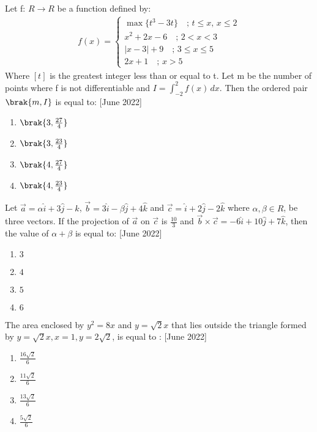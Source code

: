 \item Let f: $R\rightarrow R$ be a function defined by:
\begin{align*}
f(x) =
\begin{cases}
\max \{ t^3 - 3t \} \quad ; \, t \leq x, \, x \leq 2 \\
x^2 + 2x - 6 \quad ; \, 2 < x < 3 \\
|x - 3| + 9 \quad ; \, 3 \leq x \leq 5 \\
2x + 1 \quad ; \, x > 5
\end{cases}
\end{align*} 
Where $[t]$ is the greatest integer less than or equal to t. Let m be the number of points where f is not differentiable and $I = \int_{-2}^{2} f(x) \, dx$. Then the ordered pair $\brak{m,I}$ is equal to: \hfill[June 2022]
\begin{multicols}{2}
\begin{enumerate}
    \item $\brak{3,\frac{27}{4}}$
    \item $\brak{3,\frac{23}{4}}$
    \item $\brak{4,\frac{27}{4}}$
    \item $\brak{4,\frac{23}{4}}$
\end{enumerate}
\end{multicols}

\item Let $\vec{a}=\alpha \hat{i}+3\hat{j}-\hat{k}$, $\vec{b}=3\hat{i}-\beta\hat{j}+4\hat{k}$ and $\vec{c}=\hat{i}+2\hat{j}-2\hat{k}$ where $\alpha,\beta \in R$, be three vectors. If the projection of $\vec{a}$ on $\vec{c}$ is $\frac{10}{3}$ and $\vec{b}\times \vec{c}=-6\hat{i}+10\hat{j}+7\hat{k}$, then the value of $\alpha+\beta$ is equal to: \hfill[June 2022]
\begin{multicols}{2}
\begin{enumerate}
    \item $3$
    \item $4$
    \item $5$
    \item $6$
\end{enumerate}
\end{multicols}

\item The area enclosed by $y^2=8x$ and $y=\sqrt{2}x$ that lies outside the triangle formed by $y=\sqrt{2}x,x=1,y=2\sqrt{2}$, is equal to : \hfill[June 2022]
\begin{multicols}{2}
\begin{enumerate}
    \item $\frac{16\sqrt{2}}{6}$
    \item $\frac{11\sqrt{2}}{6}$
    \item $\frac{13\sqrt{2}}{6}$
    \item $\frac{5\sqrt{2}}{6}$ 
\end{enumerate}
\end{multicols}

